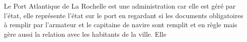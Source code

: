 Le Port Atlantique de La Rochelle est une administration
car elle est géré par l'état,
elle représente l'état sur le port en regardant
si les documents obligatoires à remplir par l'armateur
et le capitaine de navire sont remplit et en règle
mais gère aussi la relation avec les habitants de la ville.
Elle 

